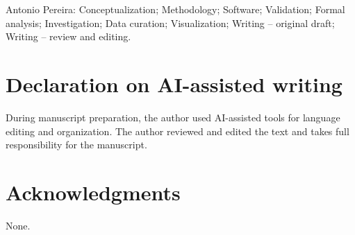 \documentclass[11pt,final]{article}
\begin{document}
Antonio Pereira: Conceptualization; Methodology; Software; Validation; Formal analysis; Investigation; Data curation; Visualization; Writing -- original draft; Writing -- review and editing.

\section*{Declaration on AI-assisted writing}

During manuscript preparation, the author used AI-assisted tools for language editing and organization. The author reviewed and edited the text and takes full responsibility for the manuscript.

\section*{Acknowledgments}

None.



\end{document}

